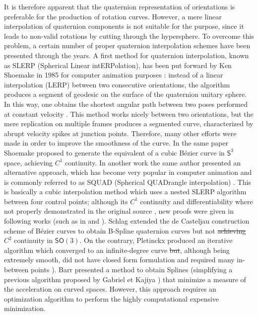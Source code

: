 \documentclass[preprint, 12pt]{elsarticle}
\providecommand{\DIFadd}[1]{{\protect\color{blue}\uwave{#1}}} %
\providecommand{\DIFdel}[1]{{\protect\color{red}\sout{#1}}}                      %
\providecommand{\DIFaddbegin}{} %
\providecommand{\DIFaddend}{} %
\providecommand{\DIFdelbegin}{} %
\providecommand{\DIFdelend}{} %
\begin{document}
It is therefore apparent that the quaternion representation of orientations is preferable for the production of rotation curves. However, a mere linear interpolation of quaternion components is not suitable for the purpose, since it leads to non-valid rotations by cutting through the hypersphere. To overcome this problem, a certain number of proper quaternion interpolation schemes have been presented through the years. A first method for quaternion interpolation, known as SLERP (Spherical Linear intERPolation), has been put forward by Ken Shoemake in 1985 for computer animation purposes \cite{shoemake1985animating}: instead of a linear interpolation (LERP) between two consecutive orientations, the algorithm produces a segment of geodesic on the surface of the quaternion unitary sphere. In this way, one obtains the shortest angular path between two poses performed at constant velocity \cite{dam1998quaternions}. This method works nicely between two orientations, but the mere replication on multiple frames produces a segmented curve, characterized by abrupt velocity spikes at junction points. Therefore, many other efforts were made in order to improve the smoothness of the curve. %
In the same paper \cite{shoemake1985animating} Shoemake proposed to generate the equivalent of a cubic B\'ezier curve in $\mathsf{S}^3$ space, achieving $C^1$ continuity. In another work the same author presented an alternative approach, which has become very popular in computer animation and is commonly referred to as SQUAD (Spherical QUADrangle interpolation) \cite{Shoemake1987QuaternionCA}. This is basically a cubic interpolation method which uses a nested SLERP algorithm between four control points; although its $C^{1}$ continuity and differentiability where not properly demonstrated in the original source \cite{dam1998quaternions}, new proofs were given in following works (such as in \cite{dam1998quaternions} and \cite{kim1996compact}). Schlag \cite{schlag1991using} extended the de Casteljau construction scheme of B\'ezier curves to obtain B-Spline quaternion curves but not \DIFdelbegin \DIFdel{achieving }\DIFdelend \DIFaddbegin \DIFadd{did not achieve }\DIFaddend $C^{2}$ continuity in $\mathsf{SO}(3)$. On the contrary, Pletinckx \cite{pletinckx1989quaternion} produced an iterative algorithm which converged to an infinite-degree curve \DIFdelbegin \DIFdel{but}\DIFdelend \DIFaddbegin \DIFadd{that}\DIFaddend , although being extremely smooth, did not have closed form formulation and required many in-between points \cite{kim1995ac}). Barr \cite{barr1992smooth} presented a method to obtain Splines (simplifying a previous algorithm proposed by Gabriel et Kajiya \cite{gabriel1985spline}) that minimize a measure of the acceleration on curved spaces. However, this approach requires an optimization algorithm to perform the highly computational expensive minimization. 
\end{document}
